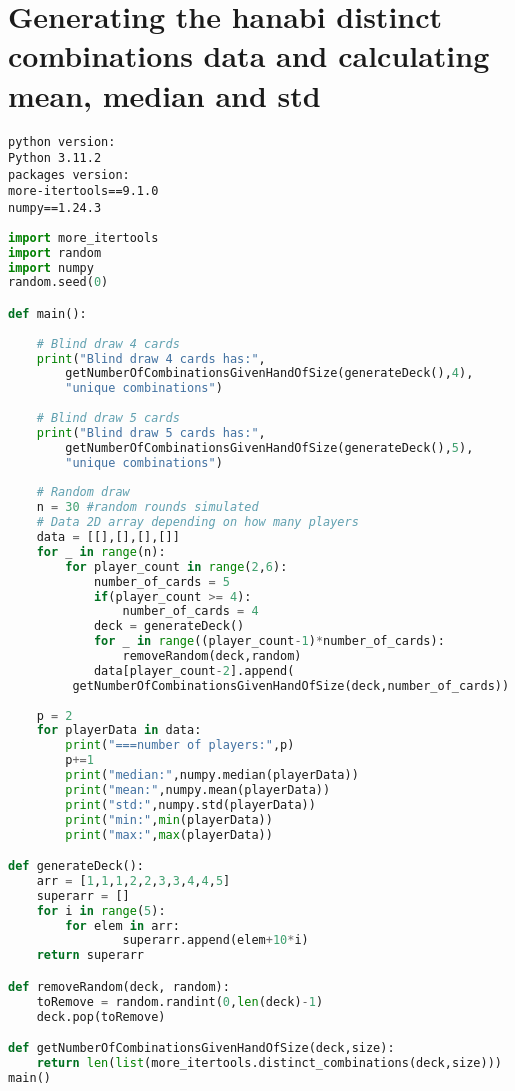 
\section{Generating the hanabi distinct combinations data and calculating mean, median and std} \label{appendix:python-distinct-combinations}
\begin{verbatim}
python version:
Python 3.11.2
packages version:
more-itertools==9.1.0
numpy==1.24.3
\end{verbatim}

\begin{lstlisting}[language=python]
import more_itertools
import random
import numpy
random.seed(0)

def main():
    
    # Blind draw 4 cards
    print("Blind draw 4 cards has:", 
    	getNumberOfCombinationsGivenHandOfSize(generateDeck(),4),
		"unique combinations")
    
    # Blind draw 5 cards
    print("Blind draw 5 cards has:", 
    	getNumberOfCombinationsGivenHandOfSize(generateDeck(),5),
		"unique combinations")
    
    # Random draw
    n = 30 #random rounds simulated
    # Data 2D array depending on how many players
    data = [[],[],[],[]]
    for _ in range(n):
        for player_count in range(2,6):
            number_of_cards = 5
            if(player_count >= 4):
                number_of_cards = 4
            deck = generateDeck()
            for _ in range((player_count-1)*number_of_cards):
                removeRandom(deck,random)
            data[player_count-2].append(
	   	 getNumberOfCombinationsGivenHandOfSize(deck,number_of_cards))
    
    p = 2
    for playerData in data:
        print("===number of players:",p)
        p+=1
        print("median:",numpy.median(playerData))
        print("mean:",numpy.mean(playerData))
        print("std:",numpy.std(playerData))
        print("min:",min(playerData))
        print("max:",max(playerData))

def generateDeck():
    arr = [1,1,1,2,2,3,3,4,4,5]
    superarr = []
    for i in range(5):
        for elem in arr:
                superarr.append(elem+10*i)
    return superarr

def removeRandom(deck, random):
    toRemove = random.randint(0,len(deck)-1)
    deck.pop(toRemove)

def getNumberOfCombinationsGivenHandOfSize(deck,size):
    return len(list(more_itertools.distinct_combinations(deck,size)))
main()
\end{lstlisting}
